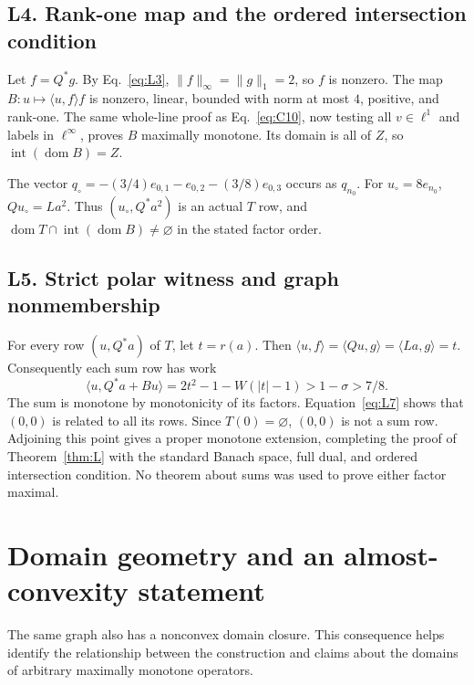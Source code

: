 \documentclass[11pt]{article}
\newcommand{\dom}{\operatorname{dom}}
\newcommand{\pair}[2]{\langle #1,#2\rangle}
\begin{document}
\subsection{L4. Rank-one map and the ordered intersection condition}
\label{sec:L4}
Let $f=Q^*g$. By Eq.~\eqref{eq:L3}, $\|f\|_\infty=\|g\|_1=2$, so $f$
is nonzero. The map $B:u\mapsto\pair{u}{f}f$ is nonzero, linear, bounded
with norm at most $4$, positive, and rank-one. The same whole-line proof
as Eq.~\eqref{eq:C10}, now testing all $v\in\ell^1$ and labels in
$\ell^\infty$, proves $B$ maximally monotone.
Its domain is all of $Z$, so $\operatorname{int}(\dom B)=Z$.

The vector $q_\circ=-(3/4)e_{0,1}-e_{0,2}-(3/8)e_{0,3}$ occurs as
$q_{n_0}$. For $u_\circ=8e_{n_0}$, $Qu_\circ=La^2$.
Thus $(u_\circ,Q^*a^2)$ is an actual $T$ row, and
$\dom T\cap\operatorname{int}(\dom B)\ne\varnothing$ in the stated
factor order.

\subsection{L5. Strict polar witness and graph nonmembership}
\label{sec:L5}
For every row $(u,Q^*a)$ of $T$, let $t=r(a)$. Then
$\pair{u}{f}=\pair{Qu}{g}=\pair{La}{g}=t$.
Consequently each sum row has work
\begin{equation}
\pair{u}{Q^*a+Bu}
 =2t^2-1-W(|t|-1)>1-\sigma>7/8.
\tag{L7}\label{eq:L7}
\end{equation}
The sum is monotone by monotonicity of its factors.
Equation~\eqref{eq:L7} shows that $(0,0)$ is related to all its rows.
Since $T(0)=\varnothing$, $(0,0)$ is not a sum row. Adjoining this point
gives a proper monotone extension, completing the proof of
Theorem~\ref{thm:L} with the standard Banach space, full dual, and ordered
intersection condition. No theorem about sums was used to prove either
factor maximal.

\section{Domain geometry and an almost-convexity statement}
\label{sec:domain-comparison}
The same graph also has a nonconvex domain closure. This consequence
helps identify the relationship between the construction and claims
about the domains of arbitrary maximally monotone operators.
\end{document}
